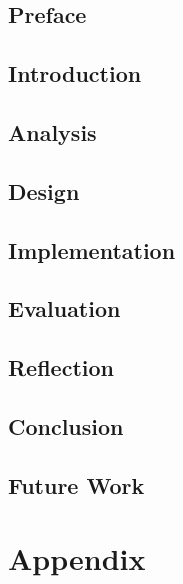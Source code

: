 





\chapter*{Preface}



\tableofcontents

\chapter{Introduction}





\chapter{Analysis}



\chapter{Design}


\chapter{Implementation}


\chapter{Evaluation}




\chapter{Reflection}


\chapter{Conclusion}


\chapter{Future Work}


\printbibliography

\part{Appendix}
\appendix


